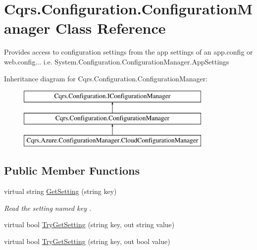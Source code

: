 \hypertarget{classCqrs_1_1Configuration_1_1ConfigurationManager}{}\section{Cqrs.\+Configuration.\+Configuration\+Manager Class Reference}
\label{classCqrs_1_1Configuration_1_1ConfigurationManager}


Provides access to configuration settings from the app settings of an app.\+config or web.\+config... i.\+e. System.\+Configuration.\+Configuration\+Manager.\+App\+Settings  


Inheritance diagram for Cqrs.\+Configuration.\+Configuration\+Manager\+:\begin{figure}[H]
\begin{center}
\leavevmode
\includegraphics[height=3.000000cm]{classCqrs_1_1Configuration_1_1ConfigurationManager}
\end{center}
\end{figure}
\subsection*{Public Member Functions}
\begin{DoxyCompactItemize}
\item 
virtual string \hyperlink{classCqrs_1_1Configuration_1_1ConfigurationManager_ac3e31af665b95b781fee23f577170a63_ac3e31af665b95b781fee23f577170a63}{Get\+Setting} (string key)
\begin{DoxyCompactList}\small\item\em Read the setting named {\itshape key} . \end{DoxyCompactList}\item 
virtual bool \hyperlink{classCqrs_1_1Configuration_1_1ConfigurationManager_ad87af2a011af065d6d3e0d2ff01c7f6e_ad87af2a011af065d6d3e0d2ff01c7f6e}{Try\+Get\+Setting} (string key, out string value)
\item 
virtual bool \hyperlink{classCqrs_1_1Configuration_1_1ConfigurationManager_a40810d0b9fd2f3d1c4a270681e908c84_a40810d0b9fd2f3d1c4a270681e908c84}{Try\+Get\+Setting} (string key, out bool value)
\end{DoxyCompactItemize}


